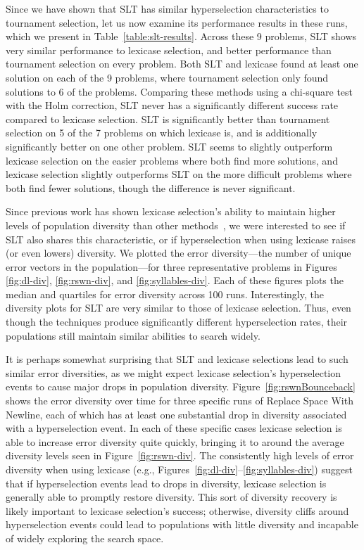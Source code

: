 \documentclass{sig-alternate}
\begin{document}
Since we have shown that SLT has similar hyperselection characteristics to tournament selection, let us now examine its performance results in these runs, which we present in Table~\ref{table:slt-results}. Across these 9 problems, SLT shows very similar performance to lexicase selection, and better performance than tournament selection on every problem. Both SLT and lexicase found at least one solution on each of the 9 problems, where tournament selection only found solutions to 6 of the problems. Comparing these methods using a chi-square test with the Holm correction, SLT never has a significantly different success rate compared to lexicase selection. SLT is significantly better than tournament selection on 5 of the 7 problems on which lexicase is, and is additionally significantly better on one other problem.
 SLT seems to slightly outperform lexicase selection on the easier problems where both find more solutions, and lexicase selection slightly outperforms SLT on the more difficult problems where both find fewer solutions, though the difference is never significant.

Since previous work has shown lexicase selection's ability to maintain higher levels of population diversity than other methods~\cite{Helmuth:2015:GPTP}, we were interested to see if SLT also shares this characteristic, or if hyperselection when using lexicase raises (or even lowers) diversity. We plotted the error diversity---the number of unique error vectors in the population---for three representative problems in Figures \ref{fig:dl-div}, \ref{fig:rswn-div}, and \ref{fig:syllables-div}. Each of these figures plots the median and quartiles for error diversity across 100 runs. Interestingly, the diversity plots for SLT are very similar to those of lexicase selection. Thus, even though the techniques produce significantly different hyperselection rates, their populations still maintain similar abilities to search widely.

It is perhaps somewhat surprising that SLT and lexicase selections lead to such similar error diversities, as we might expect lexicase selection's hyperselection events to cause major drops in population diversity. Figure~\ref{fig:rswnBounceback} shows the error diversity over time for three specific runs of Replace Space With Newline, each of which has at least one substantial drop in diversity associated with a hyperselection event. In each of these specific cases lexicase selection is able to increase error diversity quite quickly, bringing it to around the average diversity levels seen in Figure~\ref{fig:rswn-div}. The consistently high levels of error diversity when using lexicase (e.g., Figures~\ref{fig:dl-div}--\ref{fig:syllables-div}) suggest that if hyperselection events lead to drops in diversity, lexicase selection is generally able to promptly restore diversity. This sort of diversity recovery is likely important to lexicase selection's success; otherwise, diversity cliffs around hyperselection events could lead to populations with little diversity and incapable of widely exploring the search space.
\end{document}
